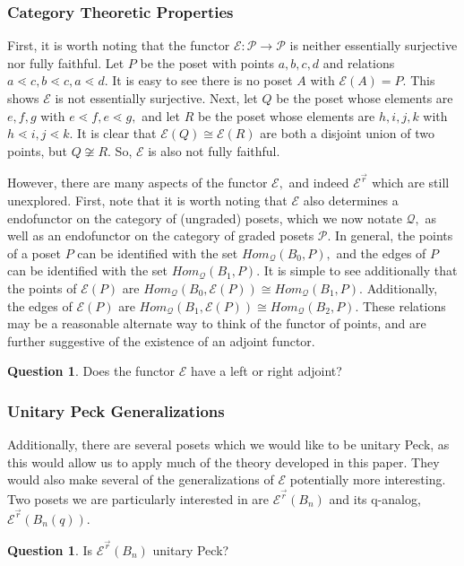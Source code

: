 \documentclass[10 pt]{amsart}
\theoremstyle{plain}
\theoremstyle{definition}
\newtheorem{question}[thm]{Question}
\theoremstyle{remark}
\numberwithin{equation}{section}
\newcommand\sssec{\subsubsection}
\renewcommand{\vec}[1]{\overrightarrow{#1}}
\begin{document}
\sssec{Category Theoretic Properties}

First, it is worth noting that the functor $\mathcal E:\mathcal P \rightarrow \mathcal P$ is neither essentially surjective nor fully faithful. Let $P$ be the poset with points $a,b,c,d$ and relations $a \lessdot c, b \lessdot c, a \lessdot d.$ It is easy to see there is no poset $A$ with $\mathcal E(A) = P.$ This shows $\mathcal E$ is not essentially surjective. Next, let $Q$ be the poset whose elements are $e,f,g$ with $e \lessdot f, e \lessdot g,$ and let $R$ be the poset whose elements are $h,i,j,k$ with $h \lessdot i, j \lessdot k.$ It is clear that $\mathcal E(Q) \cong \mathcal E(R)$ are both a disjoint union of two points, but $Q \not \cong R.$ So, $\mathcal E$ is also not fully faithful.

However, there are many aspects of the functor $\mathcal E,$ and indeed $\mathcal E^{\vec r}$ which are still unexplored. First, note that it is worth noting that $\mathcal E$ also determines a endofunctor on the category of (ungraded) posets, which we now notate $\mathcal Q,$ as well as an endofunctor on the category of graded posets $\mathcal P.$ In general, the points of a poset $P$ can be identified with the set $Hom_{\mathcal Q}(B_0,P),$ and the edges of $P$ can be identified with the set $Hom_{\mathcal Q}(B_1,P).$ It is simple to see additionally that the points of $\mathcal E(P)$ are $Hom_{\mathcal Q}(B_0,\mathcal E(P)) \cong Hom_{\mathcal Q}(B_1,P).$ Additionally, the edges of $\mathcal E(P)$ are $Hom_{\mathcal Q}(B_1,\mathcal E(P)) \cong Hom_{\mathcal Q}(B_2,P).$ These relations may be a reasonable alternate way to think of the functor of points, and are further suggestive of the existence of an adjoint functor.

\begin{question}
Does the functor $\mathcal E$ have a left or right adjoint?
\end{question}

\sssec{Unitary Peck Generalizations}

Additionally, there are several posets which we would like to be unitary  
Peck, as this would allow us to apply much of the theory developed in this paper. They would also make several of the generalizations of $\mathcal E$ potentially more interesting. Two posets we are particularly interested in are $\mathcal E^{\vec r}(B_n)$ and its q-analog, $\mathcal E^{\vec r}(B_n(q)).$

\begin{question}
Is $\mathcal E^{\vec r}(B_n)$ unitary Peck?
\end{question}
\end{document}
